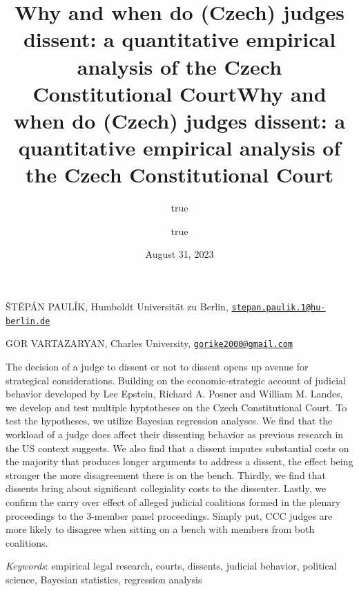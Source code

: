 \documentclass[
  11pt,
]{article}
\title{Why and when do (Czech) judges dissent: a quantitative empirical
analysis of the Czech Constitutional Court}
\author{true \and true}
\date{August 31, 2023}
\title{Why and when do (Czech) judges dissent: a quantitative empirical
analysis of the Czech Constitutional Court }
\date{}
\renewenvironment{abstract}
 {{%
    \setlength{\leftmargin}{0mm}
    \setlength{\rightmargin}{\leftmargin}%
  }%
  \relax}
 {\endlist}
\begin{document}



{%
\setlength{\parindent}{0pt}
\thispagestyle{plain}
{%
\maketitle  %

}




{
   \vskip 13.5pt\relax \normalsize\fontsize{11}{12}
   \MakeUppercase{Štěpán Paulík}, \small{Humboldt Universität zu Berlin,
\href{mailto:stepan.paulik.1@hu-berlin.de}{\nolinkurl{stepan.paulik.1@hu-berlin.de}}}   \par \vskip -3.5pt \MakeUppercase{Gor
Vartazaryan}, \small{Charles University,
\href{mailto:gorike2000@gmail.com}{\nolinkurl{gorike2000@gmail.com}}}   

}

}








\begin{abstract}


    \vskip 8.5pt %

\noindent \small{The decision of a judge to dissent or not to dissent
opens up avenue for strategical considerations. Building on the
economic-strategic account of judicial behavior developed by Lee
Epstein, Richard A. Posner and William M. Landes, we develop and test
multiple hyptotheses on the Czech Constitutional Court. To test the
hypotheses, we utilize Bayesian regression analyses. We find that the
workload of a judge does affect their dissenting behavior as previous
research in the US context suggests. We also find that a dissent imputes
substantial costs on the majority that produces longer arguments to
address a dissent, the effect being stronger the more disagreement there
is on the bench. Thirdly, we find that dissents bring about significant
collegiality costs to the dissenter. Lastly, we confirm the carry over
effect of alleged judicial coalitions formed in the plenary proceedings
to the 3-member panel proceedings. Simply put, CCC judges are more
likely to disagree when sitting on a bench with members from both
coalitions.}


\vskip 8.5pt \noindent \emph{Keywords}: empirical legal research,
courts, dissents, judicial behavior, political science, Bayesian
statistics, regression analysis \par




\end{abstract}
\end{document}
